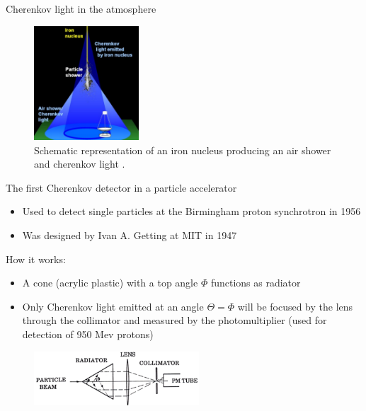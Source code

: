\documentclass[aspectratio=1610, 10pt]{beamer}
\begin{document}

\begin{frame}{Cherenkov light in the atmosphere}
  \begin{figure}
    \includegraphics[width=0.35\textwidth]{images/cherenkov_cone.png}
    \caption{Schematic representation of an iron nucleus producing an air shower and cherenkov light \cite{hess}.}
  \end{figure}
\end{frame}

\begin{frame}{The first Cherenkov detector in a particle accelerator}
  \begin{itemize}
    \item Used to detect single particles at the Birmingham proton synchrotron in 1956
    \medskip
    \item Was designed by Ivan A. Getting at MIT in 1947
  \end{itemize}

How it works:
\begin{itemize}
  \item A cone (acrylic plastic) with a top angle $\Phi$ functions as radiator
  \medskip
  \item Only Cherenkov light emitted at an angle $\Theta = \Phi$ will be focused by the lens through the collimator and measured by the
  photomultiplier (used for detection of 950 Mev protons)
\end{itemize}
\begin{figure}
  \includegraphics[width=0.55\textwidth]{images/the_second.png}
\end{figure}
\end{frame}
\end{document}
